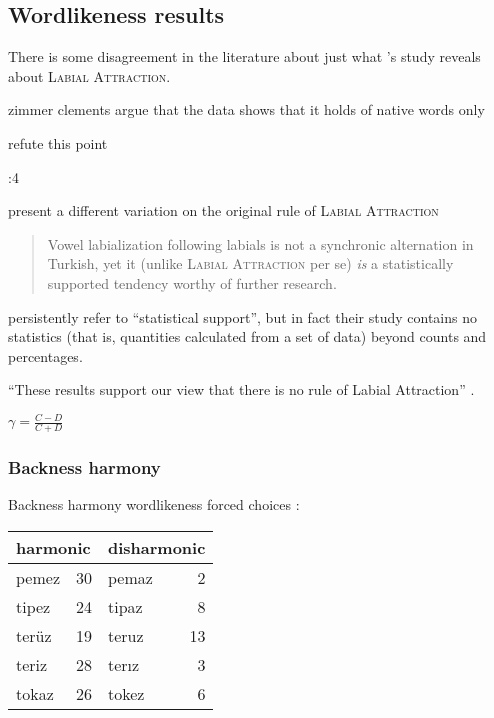 \subsection{Wordlikeness results}

There is some disagreement in the literature about just what \citeauthor{Zimmer1969}'s study reveals about \textsc{Labial Attraction}.

zimmer
clements
\citet{Ito1993} 
argue that the data shows that it holds of native words only


\citet{Inkelas2001} refute this point


\citet{Zuraw2000}:4

\citet{Inkelas2001} present a different variation on the original rule of \textsc{Labial Attraction}


\begin{quote}
Vowel labialization following labials is not a synchronic alternation in Turkish, yet it (unlike \textsc{Labial Attraction} per se) \emph{is} a statistically supported tendency worthy of further research. \citep[][196, emphasis in original]{Inkelas2001}
\end{quote}

\noindent \citeauthor{Inkelas2001} persistently refer to ``statistical support'', but in fact their study contains no statistics (that is, quantities calculated from a set of data) beyond counts and percentages. 



``These results support our view that there is no rule of Labial Attraction'' \citep[][225]{Clements1982}.


\citet{Goodman1954}

\begin{example}
$\displaystyle \gamma = \frac{C - D}{C + D}$
\end{example}

\subsubsection{Backness harmony}


\begin{example}
Backness harmony wordlikeness forced choices \citep[314]{Zimmer1969}: 

\vspace{0.5\baselineskip}
\begin{tabular}{l r l r}
\toprule
\multicolumn{2}{l}{harmonic} & \multicolumn{2}{l}{disharmonic} \\
\midrule
pemez & 30                   & pemaz & 2  \\
tipez & 24                   & tipaz & 8  \\ 
terüz & 19                   & teruz & 13 \\ %
teriz & 28                   & terız & 3  \\
tokaz & 26                   & tokez & 6  \\ %
\bottomrule
\end{tabular}
\end{example}

